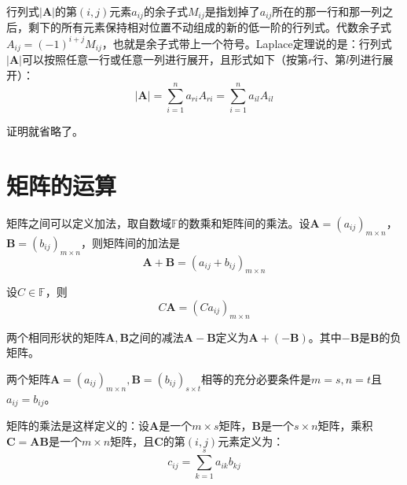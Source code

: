     行列式$|\bm{A}|$的第$(i,j)$元素$a_{ij}$的余子式$M_{ij}$是指划掉了$a_{ij}$所在的那一行和那一列之后，剩下的所有元素保持相对位置不动组成的新的低一阶的行列式。代数余子式$A_{ij}=(-1)^{i+j}M_{ij}$，也就是余子式带上一个符号。Laplace定理说的是：行列式$|\bm{A}|$可以按照任意一行或任意一列进行展开，且形式如下（按第$r$行、第$l$列进行展开）：
    \begin{equation}
        \label{eq:4}
        |\bm{A}|=\sum_{i=1}^{n}a_{ri}A_{ri}=\sum_{i=1}^{n}a_{il}A_{il}
    \end{equation}

    证明就省略了。

    \section{矩阵的运算}
    矩阵之间可以定义加法，取自数域$\mathbb{F}$的数乘和矩阵间的乘法。设$\bm{A}=(a_{ij})_{m\times n}$，$\bm{B}=(b_{ij})_{m\times n}$，则矩阵间的加法是
    \begin{equation}
        \label{eq:5}
        \bm{A}+\bm{B}=(a_{ij}+b_{ij})_{m\times n}
    \end{equation}
    
    设$C\in\mathbb{F}$，则
    \begin{equation}
        \label{eq:6}
        C\bm{A}=(Ca_{ij})_{m\times n}
    \end{equation}

    两个相同形状的矩阵$\bm{A},\bm{B}$之间的减法$\bm{A}-\bm{B}$定义为$\bm{A}+(-\bm{B})$。其中$-\bm{B}$是$\bm{B}$的负矩阵。


    两个矩阵$\bm{A}=(a_{ij})_{m\times n},\bm{B}=(b_{ij})_{s\times t}$相等的充分必要条件是$m=s,n=t$且$a_{ij}=b_{ij}$。

    矩阵的乘法是这样定义的：设$\bm{A}$是一个$m\times s$矩阵，$\bm{B}$是一个$s\times n$矩阵，乘积$\bm{C}=\bm{A}\bm{B}$是一个$m\times n$矩阵，且$\bm{C}$的第$(i,j)$元素定义为：
    \begin{equation}
        \label{eq:7}
        c_{ij}=\sum_{k=1}^{s}a_{ik}b_{kj}
    \end{equation}

